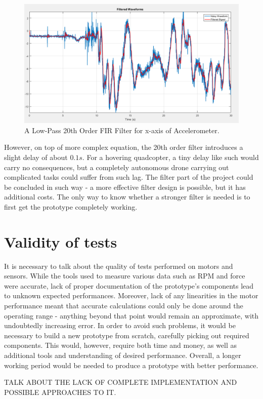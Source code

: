 \begin{figure}[H]
  \centering
    \includegraphics[width=1\textwidth]{images/newFilter.png}
	\caption{A Low-Pass 20th Order FIR Filter for x-axis of Accelerometer.}
	\label{newFilter}
\end{figure}

However, on top of more complex equation, the 20th order filter introduces a slight delay of about $0.1s$. For a hovering quadcopter, a tiny delay like such would carry no consequences, but a completely autonomous drone carrying out complicated tasks could suffer from such lag.
The filter part of the project could be concluded in such way - a more effective filter design is possible, but it has additional costs. The only way to know whether a stronger filter is needed is to first get the prototype completely working.

\section{Validity of tests}
It is necessary to talk about the quality of tests performed on motors and sensors. While the tools used to measure various data such as RPM and force were accurate, lack of proper documentation of the prototype's components lead to unknown expected performances. Moreover, lack of any linearities in the motor performance meant that accurate calculations could only be done around the operating range - anything beyond that point would remain an approximate, with undoubtedly increasing error.
In order to avoid such problems, it would be necessary to build a new prototype from scratch, carefully picking out required components. This would, however, require both time and money, as well as additional tools and understanding of desired performance. Overall, a longer working period would be needed to produce a prototype with better performance.

TALK ABOUT THE LACK OF COMPLETE IMPLEMENTATION AND POSSIBLE APPROACHES TO IT.